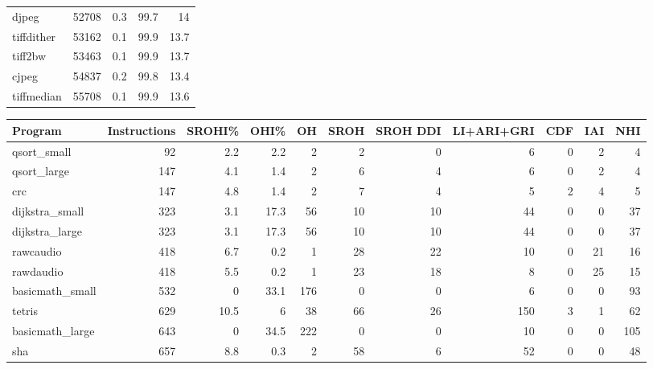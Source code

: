 \begin{tabular}{lrrrr}
 djpeg           &   52708 &    0.3 &         99.7 &    14   \\
 tiffdither      &   53162 &    0.1 &         99.9 &    13.7 \\
 tiff2bw         &   53463 &    0.1 &         99.9 &    13.7 \\
 cjpeg           &   54837 &    0.2 &         99.8 &    13.4 \\
 tiffmedian      &   55708 &    0.1 &         99.9 &    13.6 \\
\hline
\end{tabular}\begin{tabular}{lrrrrrrrrrr}
\hline
 Program         &   Instructions &   SROHI\% &   OHI\% &   OH &   SROH &   SROH DDI &   LI+ARI+GRI &   CDF &   IAI &   NHI \\
\hline
 qsort\_small     &             92 &      2.2 &    2.2 &    2 &      2 &          0 &            6 &     0 &     2 &     4 \\
 qsort\_large     &            147 &      4.1 &    1.4 &    2 &      6 &          4 &            6 &     0 &     2 &     4 \\
 crc             &            147 &      4.8 &    1.4 &    2 &      7 &          4 &            5 &     2 &     4 &     5 \\
 dijkstra\_small  &            323 &      3.1 &   17.3 &   56 &     10 &         10 &           44 &     0 &     0 &    37 \\
 dijkstra\_large  &            323 &      3.1 &   17.3 &   56 &     10 &         10 &           44 &     0 &     0 &    37 \\
 rawcaudio       &            418 &      6.7 &    0.2 &    1 &     28 &         22 &           10 &     0 &    21 &    16 \\
 rawdaudio       &            418 &      5.5 &    0.2 &    1 &     23 &         18 &            8 &     0 &    25 &    15 \\
 basicmath\_small &            532 &      0   &   33.1 &  176 &      0 &          0 &            6 &     0 &     0 &    93 \\
 tetris          &            629 &     10.5 &    6   &   38 &     66 &         26 &          150 &     3 &     1 &    62 \\
 basicmath\_large &            643 &      0   &   34.5 &  222 &      0 &          0 &           10 &     0 &     0 &   105 \\
 sha             &            657 &      8.8 &    0.3 &    2 &     58 &          6 &           52 &     0 &     0 &    48 \\

\end{tabular}
